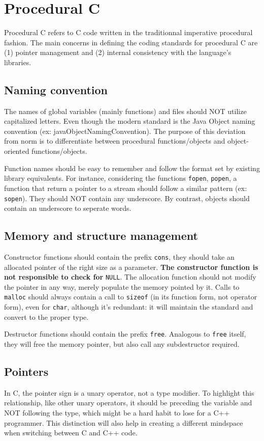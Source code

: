 \documentclass{article}
\begin{document}
\section{Procedural C}
Procedural C refers to C code written in the traditionnal imperative procedural fashion. The main concerns in defining the coding standards for procedural C are (1) pointer management and (2) internal consistency with the language's libraries.

\subsection{Naming convention}
The names of global variables (mainly functions) and files should NOT utilize capitalized letters. Even though the modern standard is the Java Object naming convention (ex: javaObjectNamingConvention). The purpose of this deviation from norm is to differentiate between procedural functions/objects and object-oriented functions/objects.

Function names should be easy to remember and follow the format set by existing library equivalents. For instance, considering the functions \texttt{fopen}, \texttt{popen}, a function that return a pointer to a stream should follow a similar pattern (ex: \texttt{sopen}). They should NOT contain any underscore. By contrast, objects should contain an underscore to seperate words.

\subsection{Memory and structure management}
Constructor functions should contain the prefix \texttt{cons}, they should take an allocated pointer of the right size as a parameter. \textbf{The constructor function is not responsible to check for} \texttt{NULL}. The allocation function should not modify the pointer in any way, merely populate the memory pointed by it. Calls to \texttt{malloc} should always contain a call to \texttt{sizeof} (in its function form, not operator form), even for \texttt{char}, although it's redundant: it will maintain the standard and convert to the proper type.

Destructor functions should contain the prefix \texttt{free}. Analogous to \texttt{free} itself, they will free the memory pointer, but also call any subdestructor required.

\subsection{Pointers}
In C, the pointer sign is a unary operator, not a type modifier. To highlight this relationship, like other unary operators, it should be preceding the variable and NOT following the type, which might be a hard habit to lose for a C++ programmer. This distinction will also help in creating a different mindspace when switching between C and C++ code.
\end{document}
